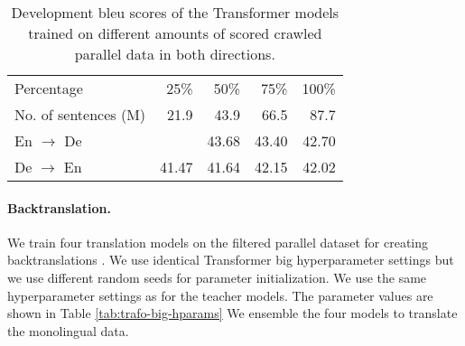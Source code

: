 \begin{table}
  \centering
  \begin{tabular}{lrrrr}
    \toprule
    Percentage & 25\% & 50\% & 75\% & 100\% \\
    No. of sentences (M) & 21.9  & 43.9 & 66.5 & 87.7 \\
    \midrule
    En $\rightarrow$ De &  & 43.68 & 43.40 & 42.70 \\
    De $\rightarrow$ En & 41.47 & 41.64 & 42.15 & 42.02 \\
    \bottomrule
  \end{tabular}
  \caption{Development \acs{bleu} scores of the Transformer models trained on
    different amounts of scored crawled parallel data in both directions.}%
  \label{tab:dual-cross-entropy-selection}
\end{table}


\paragraph{Backtranslation.} We train four translation models on the filtered
parallel dataset for creating backtranslations
\citep{sennrich-etal-2016-improving}. We use identical Transformer big
hyperparameter settings but we use different random seeds for parameter
initialization. We use the same hyperparameter settings as for the teacher
models. The parameter values are shown in Table \ref{tab:trafo-big-hparams}
We ensemble the four models to translate the monolingual data.  

